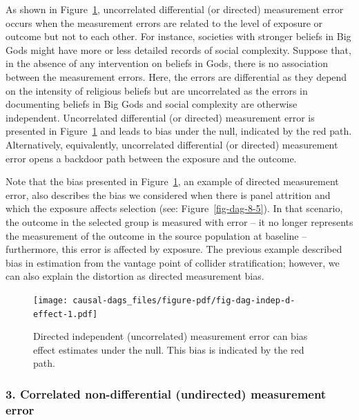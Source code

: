 \documentclass[
  singlecolumn]{article}
\begin{document}
As shown in Figure~\ref{fig-dag-indep-d-effect}, uncorrelated
differential (or directed) measurement error occurs when the measurement
errors are related to the level of exposure or outcome but not to each
other. For instance, societies with stronger beliefs in Big Gods might
have more or less detailed records of social complexity. Suppose that,
in the absence of any intervention on beliefs in Gods, there is no
association between the measurement errors. Here, the errors are
differential as they depend on the intensity of religious beliefs but
are uncorrelated as the errors in documenting beliefs in Big Gods and
social complexity are otherwise independent. Uncorrelated differential
(or directed) measurement error is presented in
Figure~\ref{fig-dag-indep-d-effect} and leads to bias under the null,
indicated by the red path. Alternatively, equivalently, uncorrelated
differential (or directed) measurement error opens a backdoor path
between the exposure and the outcome.

Note that the bias presented in Figure~\ref{fig-dag-indep-d-effect}, an
example of directed measurement error, also describes the bias we
considered when there is panel attrition and which the exposure affects
selection (see: Figure~\ref{fig-dag-8-5}). In that scenario, the outcome
in the selected group is measured with error -- it no longer represents
the measurement of the outcome in the source population at baseline --
furthermore, this error is affected by exposure. The previous example
described bias in estimation from the vantage point of collider
stratification; however, we can also explain the distortion as directed
measurement bias.

\begin{figure}

{\centering \texttt{[image: causal-dags\_files/figure-pdf/fig-dag-indep-d-effect-1.pdf]}

}

\caption{\label{fig-dag-indep-d-effect}Directed independent
(uncorrelated) measurement error can bias effect estimates under the
null. This bias is indicated by the red path.}

\end{figure}

\hypertarget{correlated-non-differential-undirected-measurement-error}{%
\subsubsection{3. Correlated non-differential (undirected) measurement
error}\label{correlated-non-differential-undirected-measurement-error}}
\end{document}
